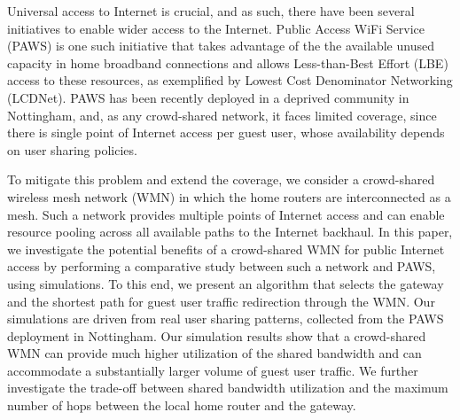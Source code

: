 Universal access to Internet is crucial, and as such, there have been several initiatives to enable wider access to the Internet. Public Access WiFi Service (PAWS) is one such initiative that takes advantage of the the available unused capacity in home broadband connections and allows Less-than-Best Effort (LBE) access to these resources, as exemplified by Lowest Cost Denominator Networking (LCDNet). PAWS has been recently deployed in a deprived community in Nottingham, and, as any crowd-shared network, it faces limited coverage, since there is single point of Internet access per guest user, whose availability depends on user sharing policies.

To mitigate this problem and extend the coverage, we consider a crowd-shared wireless mesh network (WMN) in which the home routers are interconnected as a mesh. Such a network provides multiple points of Internet access and can enable resource pooling across all available paths to the Internet backhaul. In this paper, we investigate the potential benefits of a crowd-shared WMN for public Internet access by performing a comparative study between such a network and PAWS, using simulations. To this end, we present an algorithm that selects the gateway and the shortest path for guest user traffic redirection through the WMN. Our simulations are driven from real user sharing patterns, collected from the PAWS deployment in Nottingham. Our simulation results show that a crowd-shared WMN can provide much higher utilization of the shared bandwidth and can accommodate a substantially larger volume of guest user traffic. We further investigate the trade-off between shared bandwidth utilization and the maximum number of hops between the local home router and the gateway.

